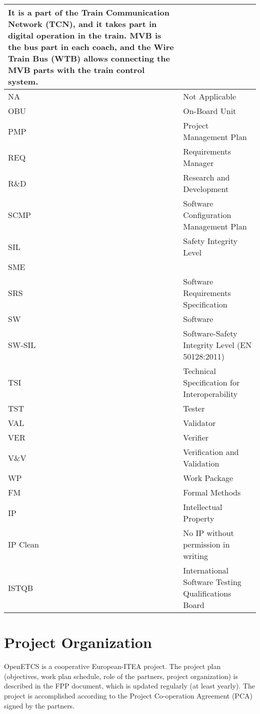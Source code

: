 \documentclass{template/openetcs_article}
\begin{document}
\begin{center}
\begin{longtable}{|m{3cm}m{11cm}|}
It is a part of the Train Communication Network (TCN), and it takes part in digital operation in the train. MVB is the bus part in each coach, and the Wire Train Bus (WTB) allows connecting the MVB parts with the train control system.\\\hline
NA &
Not Applicable\\\hline
OBU &
On-Board Unit\\\hline
PMP &
Project Management Plan\\\hline
REQ &
Requirements Manager\\\hline
R\&D &
Research and Development\\\hline
SCMP &
Software Configuration Management Plan\\\hline
SIL &
Safety Integrity Level\\\hline
SME &
~
\\\hline
SRS &
Software Requirements Specification\\\hline
SW &
Software\\\hline
SW-SIL &
Software-Safety Integrity Level (EN 50128:2011)\\\hline
TSI &
Technical Specification for Interoperability\\\hline
TST &
Tester\\\hline
VAL &
Validator\\\hline
VER &
Verifier\\\hline
V\&V &
Verification and Validation\\\hline
WP &
Work Package\\\hline
FM &
Formal Methods\\\hline
IP &
Intellectual Property\\\hline
IP Clean &
No IP without permission in writing \\\hline
ISTQB &
International Software Testing Qualifications Board \\\hline
\end{longtable}
\end{center}

\newpage
\section{Project Organization}

OpenETCS is a cooperative European-ITEA project. The project plan (objectives, work plan schedule, role of the partners, project organization) is described in the \citep{fpp} FPP document, which is updated regularly (at least yearly). The project is accomplished according to the Project Co-operation Agreement (PCA) \citep{PCA} signed by the partners.
\end{document}
